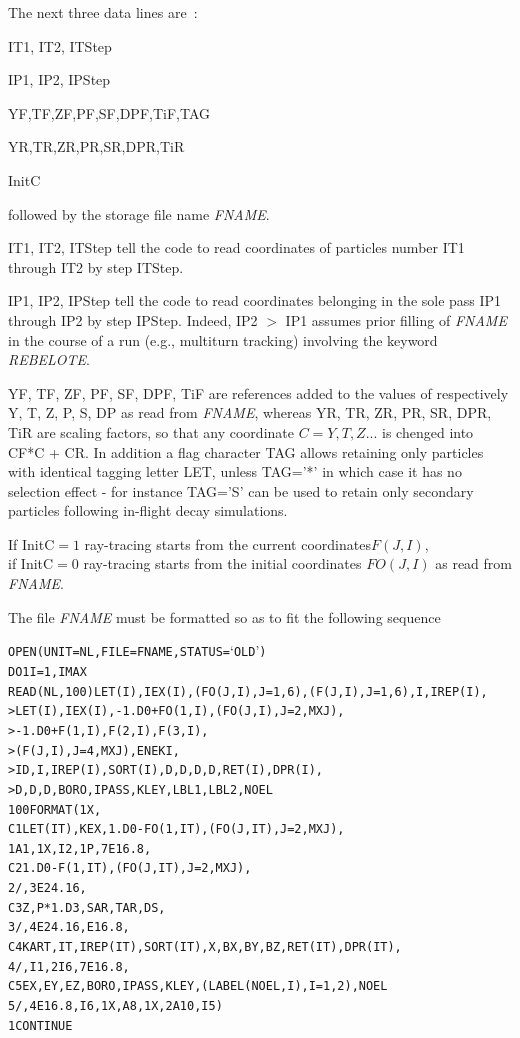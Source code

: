 \noindent The next three data lines are~: 

\smallskip 

IT1, IT2, ITStep

IP1, IP2, IPStep

YF,TF,ZF,PF,SF,DPF,TiF,TAG

YR,TR,ZR,PR,SR,DPR,TiR

InitC

\smallskip 

\noindent followed by the storage file name \textsl{FNAME}. 

\smallskip 

\noindent IT1, IT2, ITStep tell the code to read coordinates of particles number IT1 through  IT2 by step ITStep. 

\smallskip 

\noindent IP1, IP2, IPStep  tell the code to read coordinates belonging in the sole pass   IP1 through  IP2 by step IPStep. 
Indeed, IP2 $>$ IP1 assumes prior filling of \textsl{FNAME} in the course of a run (e.g., multiturn tracking) 
involving  the keyword \textsl{REBELOTE}. 

\smallskip 

\noindent YF, TF, ZF, PF, SF, DPF, TiF are references added to the  values of respectively Y, T, Z, P, S, DP as read 
from \textsl{FNAME}, whereas 
 YR, TR, ZR, PR, SR, DPR, TiR are scaling factors, so that any coordinate $C=Y,T,Z...$ is chenged into CF*C + CR. 
In addition a flag character TAG allows retaining only particles with identical tagging letter LET, unless 
TAG='*' in which case it has no selection effect - for instance TAG='S' can be used to retain only secondary 
particles following in-flight decay simulations. 

\smallskip 

\noindent 
If \mbox{InitC$=1$} ray-tracing starts from the current coordinates$ F(J,I)$, \\
if \mbox{InitC$=0$}  ray-tracing starts from the initial coordinates $ FO(J,I)$ as read from \textsl{FNAME}. 

\smallskip 


The  file \textsl{FNAME} must be formatted so as to fit the following \FORTRAN sequence 
\begin{alltt}
\footnotesize
         OPEN (UNIT = NL, FILE = FNAME, STATUS = `OLD')
	 DO 1 I = 1, IMAX
	    READ (NL,100) LET (I), IEX(I), (FO(J,I),J=1,6), (F(J,I),J=1,6), I, IREP(I),
     >      LET(I),IEX(I),-1.D0+FO(1,I),(FO(J,I),J=2,MXJ),
     >      -1.D0+F(1,I),F(2,I),F(3,I),
     >      (F(J,I),J=4,MXJ),ENEKI,
     >      ID,I,IREP(I), SORT(I),D,D,D,D,RET(I),DPR(I),
     >      D, D, D, BORO, IPASS, KLEY,LBL1,LBL2,NOEL
 100        FORMAT(1X,
C1   LET(IT),KEX,   1.D0-FO(1,IT),(FO(J,IT),J=2,MXJ),
     1           A1,1X,I2,1P,7E16.8,
C2   1.D0-F(1,IT),(FO(J,IT),J=2,MXJ),
     2         /,3E24.16,
C3   Z,P*1.D3,SAR,     TAR,     DS,
     3         /,4E24.16,E16.8,
C4   KART,  IT,IREP(IT),SORT(IT),X, BX,BY,BZ, RET(IT), DPR(IT),
     4         /,I1,2I6,7E16.8,
C5        EX,EY,EZ, BORO,  IPASS,  KLEY,  (LABEL(NOEL,I),I=1,2),NOEL
     5  /,4E16.8,          I6,1X,  A8,1X,  2A10,                I5)
    1    CONTINUE
\end{alltt} 

